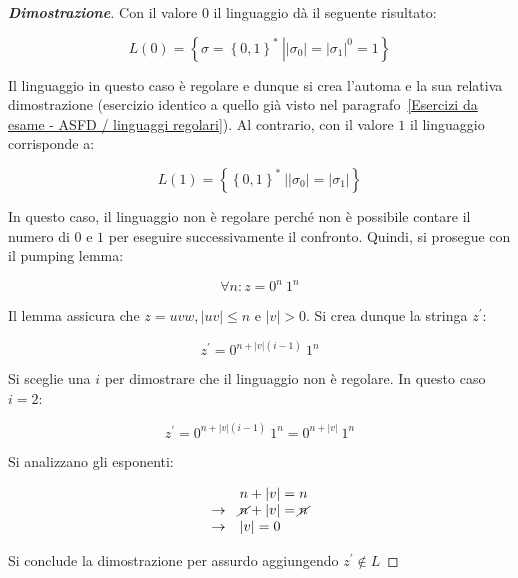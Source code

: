 \documentclass[a4paper]{article}
\begin{document}
	\begin{proof}[\textcolor{Blue3}{\textbf{Dimostrazione}}]
		Con il valore $0$ il linguaggio dà il seguente risultato:
		
		\begin{equation*}
			L\left(0\right) = \left\{\sigma = \left\{0,1\right\}^{*} \: \left| |\sigma_{0}| = |\sigma_{1}|^{0} = 1 \right.\right\}
		\end{equation*}
	
		\noindent
		Il linguaggio in questo caso è regolare e dunque si crea l'automa e la sua relativa dimostrazione (esercizio identico a quello già visto nel paragrafo~\ref{Esercizi da esame - ASFD / linguaggi regolari}). Al contrario, con il valore $1$ il linguaggio corrisponde a:
		
		\begin{equation*}
			L\left(1\right) = \left\{\left\{0,1\right\}^{*} \: \left| |\sigma_{0}| = |\sigma_{1}| \right.\right\}
		\end{equation*}
	
		\noindent
		In questo caso, il linguaggio non è regolare perché non è possibile contare il numero di $0$ e $1$ per eseguire successivamente il confronto. Quindi, si prosegue con il pumping lemma:
		
		\begin{equation*}
			\forall n : z = 0^{n} \: 1^{n}
		\end{equation*}
	
		\noindent
		Il lemma assicura che $z = uvw, |uv| \le n$ e $|v| > 0$. Si crea dunque la stringa $z^{'}$:
		
		\begin{equation*}
			z^{'} = 0^{n + |v|\left(i-1\right)} \: 1^{n}
		\end{equation*}
	
		\noindent
		Si sceglie una $i$ per dimostrare che il linguaggio non è regolare. In questo caso $i = 2$:
		
		\begin{equation*}
			z^{'} = 0^{n + |v|\left(i-1\right)} \: 1^{n} = 0^{n + |v|} \: 1^{n}
		\end{equation*}
	
		\noindent
		Si analizzano gli esponenti:
		
		\begin{equation*}
			\begin{array}{cl}
				& n + |v| = n \\
				\rightarrow & \cancel{n} + |v| = \cancel{n} \\
				\rightarrow & |v| = 0
			\end{array}
		\end{equation*}
	
		\noindent
		Si conclude la dimostrazione per assurdo aggiungendo $z^{'} \notin L$
	\end{proof}
\end{document}
